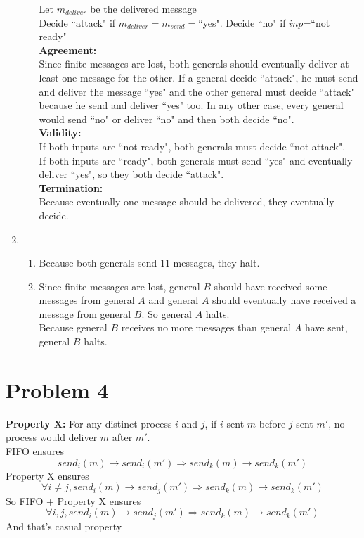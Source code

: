 \documentclass[12pt]{article}
\begin{document}
\begin{enumerate}
\begin{enumerate}
	Let $m_{deliver}$ be the delivered message\\
	Decide ``attack" if $m_{deliver}=m_{send}=$``yes". Decide ``no" if $inp$=``not ready"\\
	
	\textbf{Agreement:}\\
	Since finite messages are lost, both generals should eventually deliver at least one message for the other. If a general decide ``attack", he must send and deliver the message ``yes" and the other general must decide ``attack" because he send and deliver ``yes" too. In any other case, every general would send ``no" or deliver ``no" and then both decide ``no".\\
	
	\textbf{Validity:}\\
	If both inputs are ``not ready", both generals must decide ``not attack".\\
	If both inputs are ``ready", both generals must send ``yes" and eventually deliver ``yes", so they both decide ``attack".\\
	
	\textbf{Termination:}\\
	Because eventually one message should be delivered, they eventually decide.
	\end{enumerate}
\item
	\begin{enumerate}
	\item Because both generals send $11$ messages, they halt.
	\item Since finite messages are lost, general $B$ should have received some messages from general $A$ and general $A$ should eventually have received a message from general $B$. So general $A$ halts.\\
	Because general $B$ receives no more messages than general $A$ have sent, general $B$ halts.
	\end{enumerate}
\end{enumerate}

\section*{Problem 4}
\textbf{Property X:}
For any distinct process $i$ and $j$, if $i$ sent $m$ before $j$ sent $m'$, no process would deliver $m$ after $m'$.\\

FIFO ensures
$$send_i(m)\rightarrow send_i(m') \Rightarrow send_k(m)\rightarrow send_k(m')$$
Property X ensures
$$\forall i\neq j, send_i(m)\rightarrow send_j(m') \Rightarrow send_k(m)\rightarrow send_k(m')$$
So FIFO + Property X ensures
$$\forall i,j, send_i(m)\rightarrow send_j(m') \Rightarrow send_k(m)\rightarrow send_k(m')$$
And that's casual property
\end{document}
